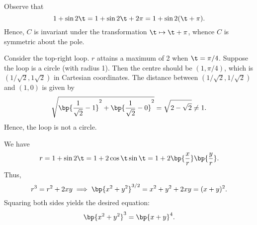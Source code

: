 \begin{solution}
    \begin{ppart}
        Observe that \[1 + \sin 2\t = 1 + \sin{2\t + 2\pi} = 1 + \sin{2(\t + \pi)}.\] Hence, $C$ is invariant under the transformation $\t \mapsto \t + \pi$, whence $C$ is symmetric about the pole.
    \end{ppart}
    \begin{ppart}
        \begin{center}
        \end{center}
    \end{ppart}
    \begin{ppart}
        Consider the top-right loop. $r$ attains a maximum of 2 when $\t = \pi/4$. Suppose the loop is a circle (with radius 1). Then the centre should be $(1, \pi/4)$, which is $(1/\sqrt2, 1\sqrt2)$ in Cartesian coordinates. The distance between $(1/\sqrt2, 1/\sqrt2)$ and $(1, 0)$ is given by \[\sqrt{\bp{\frac1{\sqrt2} - 1}^2 + \bp{\frac1{\sqrt2} - 0}^2} = \sqrt{2 - \sqrt{2}} \neq 1.\] Hence, the loop is not a circle.
    \end{ppart}
    \begin{ppart}
        We have \[r = 1 + \sin 2\t = 1 + 2\cos \t \sin \t = 1 + 2\bp{\frac{x}{r}} \bp{\frac{y}{r}}.\] Thus, \[r^3 = r^2 + 2xy \implies \bp{x^2 + y^2}^{3/2} = x^2 + y^2 + 2xy = (x + y)^2.\] Squaring both sides yields the desired equation: \[\bp{x^2 + y^2}^3 = \bp{x + y}^4.\]
    \end{ppart}
\end{solution}

